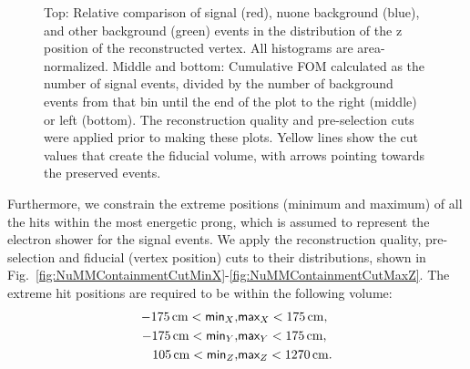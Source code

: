 \begin{figure}[hbtp]
\caption[Vertex z containment cut]{Top: Relative comparison of signal (red), \acrshort{nuone} background (blue), and other background (green) events in the distribution of the z position of the reconstructed vertex. All histograms are area-normalized. Middle and bottom: Cumulative \acrshort{FOM} calculated as the number of signal events, divided by the number of background events from that bin until the end of the plot to the right (middle) or left (bottom). The reconstruction quality and pre-selection cuts were applied prior to making these plots. Yellow lines show the cut values that create the fiducial volume, with arrows pointing towards the preserved events.}
\label{fig:NuMMFiducialCutZ}
\end{figure}

Furthermore, we constrain the extreme positions (minimum and maximum) of all the hits within the most energetic prong, which is assumed to represent the electron shower for the signal events. We apply the reconstruction quality, pre-selection and fiducial (vertex position) cuts to their distributions, shown in Fig.~\ref{fig:NuMMContainmentCutMinX}-\ref{fig:NuMMContainmentCutMaxZ}. The extreme hit positions are required to be within the following volume: 
\begin{align}
\unit[-175]{cm}<\textsf{min}_X,& \textsf{max}_X<\unit[175]{cm},\\
\unit[-175]{cm}<\textsf{min}_Y,& \textsf{max}_Y<\unit[175]{cm},\\
\unit[105]{cm}<\textsf{min}_Z,& \textsf{max}_Z<\unit[1270]{cm}.
\end{align}

